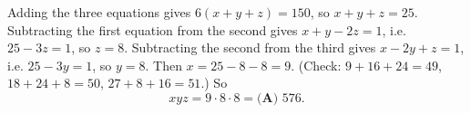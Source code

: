 Adding the three equations gives $6(x+y+z)=150$, so $x+y+z=25$. Subtracting the first equation from the second gives $x+y-2z=1$, i.e. $25-3z=1$, so $z=8$. Subtracting the second from the third gives $x-2y+z=1$, i.e. $25-3y=1$, so $y=8$. Then $x=25-8-8=9$. (Check: $9+16+24=49$, $18+24+8=50$, $27+8+16=51$.) So
\[xyz=9\cdot8\cdot8=\boxed{\textbf{(A) }576}.\]

